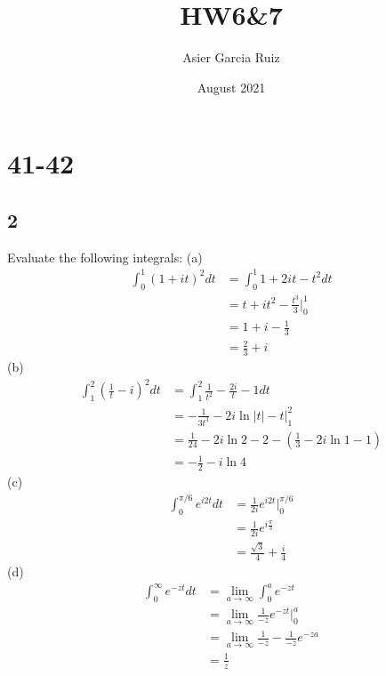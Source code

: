 \documentclass{article}
\title{HW6\&7}
\author{Asier Garcia Ruiz }
\date{August 2021}
\begin{document}
\maketitle

\section*{41-42}
\subsection*{2} %
Evaluate the following integrals:
(a)
\begin{align*}
    \int_0^1 (1 + it)^2 dt & = \int_0^1 1 + 2it - t^2 dt          \\
                           & = t + it^2 - \frac{t^3}{3} \Big|_0^1 \\
                           & = 1 + i - \frac{1}{3}                \\
                           & = \frac{2}{3} + i
\end{align*}
(b)
\begin{align*}
    \int_1^2\left(\frac{1}{t}-i\right)^2dt & = \int_1^2 \frac{1}{t^2} -\frac{2i}{t} -1 dt          \\
                                           & = -\frac{1}{3t^3} -2i\ln |t| -t \Big |_1^2            \\
                                           & = \frac{1}{24} -2i\ln 2 -2 -(\frac{1}{3} -2i\ln 1 -1) \\
                                           & = -\frac{1}{2} - i\ln 4
\end{align*}
(c)
\begin{align*}
    \int_0^{\pi/6} e^{i2t} dt & =\frac{1}{2i}e^{i2t} \Big |_0^{\pi/6} \\
                              & =\frac{1}{2i} e^{i\frac{\pi}{3}}      \\
                              & =\frac{\sqrt{3}}{4} + \frac{i}{4}
\end{align*}
(d)
\begin{align*}
    \int_0^\infty e^{-zt} dt & = \lim_{a \rightarrow \infty} \int_0^a e^{-zt}                    \\
                             & = \lim_{a \rightarrow \infty} \frac{1}{-z}e^{-zt} \Big |_0^a      \\
                             & =  \lim_{a \rightarrow \infty} \frac{1}{-z} - \frac{1}{-z}e^{-za} \\
                             & = \frac{1}{z}
\end{align*}
\end{document}

